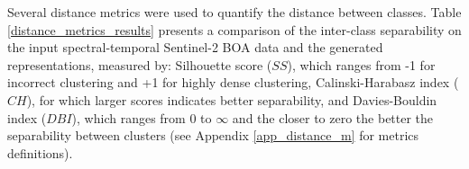 \documentclass[journal,article,submit,pdftex,moreauthors]{Definitions/mdpi}
\begin{document}

Several distance metrics were used to quantify the distance between classes. Table \ref{distance_metrics_results} presents a comparison of the inter-class separability on the input spectral-temporal Sentinel-2 BOA data and the generated representations, measured by: Silhouette score ($SS$), which ranges from -1 for incorrect clustering and +1 for highly dense clustering, Calinski-Harabasz index ($CH$), for which larger scores indicates better separability, and Davies-Bouldin index ($DBI$), which ranges from 0 to $\infty$ and the closer to zero the better the separability between clusters (see Appendix \ref{app_distance_m} for metrics definitions).
\end{document}
